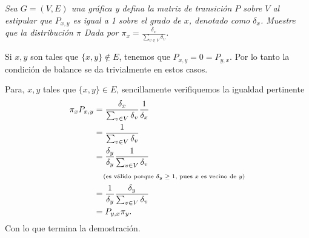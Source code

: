 \emph{
    Sea $G=(V,E)$ una gráfica y defina la matriz de transición $P$ sobre $V$ al estipular que
    $P_{x,y}$ es igual a 1 sobre el grado de $x$, denotado como $\delta_x$. Muestre que la distribución $\pi$
    Dada por $\pi_x = \frac{\delta_x}{\sum_{v \in V} \delta_v}$.
}

\afterstatement\pn

Si $x,y$ son tales que $\{x,y\} \not\in E$, tenemos que $P_{x,y} = 0 = P_{y,x}$. Por lo tanto
la condición de balance se da trivialmente en estos casos.\pn

Para, $x,y$ tales que $\{x, y\} \in E$, sencillamente verifiquemos la igualdad pertinente
\begin{align}
        \pi_x P_{x,y}   &=  \frac{\delta_x}{\sum_{v \in V} \delta_v} \frac{1}{\delta_x}          \\
                        &=  \frac{1}{\sum_{v \in V} \delta_v}                                    \\
                        &=  \frac{\delta_y}{\delta_y} \frac{1}{\sum_{v \in V} \delta_v}          \\
                        &\;\;\;\;\mbox{{\scriptsize(es válido porque $\delta_y \geq 1$, pues $x$ es vecino de $y$)}}\\
                        &=  \frac{1}{\delta_y} \frac{\delta_y}{\sum_{v \in V} \delta_v}          \\
                        &=  P_{y,x} \pi_y.
\end{align}
Con lo que termina la demostración.